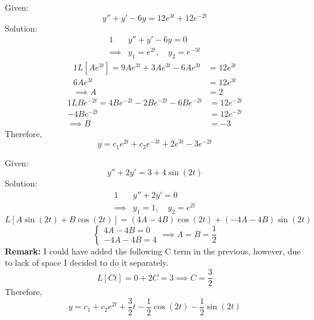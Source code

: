 \documentclass[diffeq.tex]{subfiles}
\begin{document}
\begin{homework*}[141.3]
    Given:
    \begin{equation}
        y'' + y' - 6y = 12e^{3t} + 12e^{-2t}
    \end{equation}
    Solution:
    \begin{alignat}{1}
        &y'' + y' - 6y = 0\\
        \implies& y_{1} = e^{2t},\quad y_{2} = e^{-3t}
    \end{alignat}
    \begin{alignat}{1}
        L[Ae^{3t}] = 9Ae^{3t} + 3Ae^{3t} - 6Ae^{3t} &= 12e^{3t}\\
        6Ae^{3t} &= 12e^{3t}\\
        \implies A &= 2
    \end{alignat}
    \begin{alignat}{1}
        L{Be^{-2t}} = 4Be^{-2t} - 2Be^{-2t}-6Be^{-2t} &= 12e^{-2t}\\
        -4Be^{-2t} &= 12e^{-2t}\\
        \implies B &= -3
    \end{alignat}
    Therefore,
    \begin{equation}
        y = c_{1}e^{2t} + c_{2}e^{-3t} + 2e^{3t} - 3e^{-2t}
    \end{equation}
\end{homework*}
\begin{homework*}[141.5]
    Given:
    \begin{equation}
        y'' + 2y' = 3 + 4\sin(2t)
    \end{equation}
    Solution:
    \begin{alignat}{1}
        &y'' + 2y' = 0\\
        \implies& y_{1} = 1,\quad y_{2} = e^{2t}
    \end{alignat}
    \begin{equation}
        L[A\sin(2t) + B\cos(2t)] = (4A - 4B)\cos(2t) + (-4A-4B)\sin(2t)
    \end{equation}
    \begin{equation}
        \begin{cases}
            4A - 4B = 0\\
            -4A - 4B = 4
        \end{cases}
        \implies
        A = B = \frac{1}{2}
    \end{equation}
    \textbf{Remark:} I could have added the following C term in the previous, however, due to lack of space I decided to do it separately.
    \begin{equation}
        L[Ct] = 0 + 2C = 3 \implies C = \frac{3}{2}
    \end{equation}
    Therefore,
    \begin{equation}
        y = c_{1} + c_{2}e^{2t} + \frac{3}{2}t - \frac{1}{2}\cos(2t) - \frac{1}{2}\sin(2t)
    \end{equation}
\end{homework*}
\end{document}
